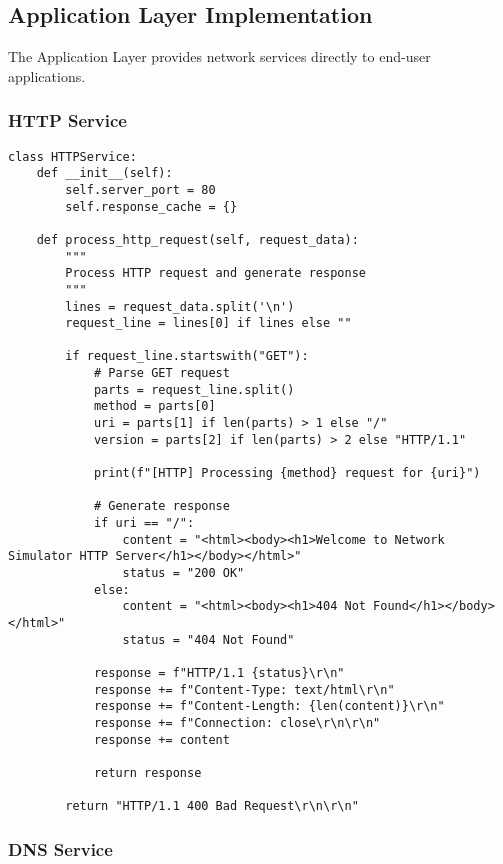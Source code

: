 \documentclass[12pt,a4paper]{article}
\begin{document}
\subsection{Application Layer Implementation}

The Application Layer provides network services directly to end-user applications.

\subsubsection{HTTP Service}

\begin{lstlisting}[caption=HTTP Protocol Implementation]
class HTTPService:
    def __init__(self):
        self.server_port = 80
        self.response_cache = {}
    
    def process_http_request(self, request_data):
        """
        Process HTTP request and generate response
        """
        lines = request_data.split('\n')
        request_line = lines[0] if lines else ""
        
        if request_line.startswith("GET"):
            # Parse GET request
            parts = request_line.split()
            method = parts[0]
            uri = parts[1] if len(parts) > 1 else "/"
            version = parts[2] if len(parts) > 2 else "HTTP/1.1"
            
            print(f"[HTTP] Processing {method} request for {uri}")
            
            # Generate response
            if uri == "/":
                content = "<html><body><h1>Welcome to Network Simulator HTTP Server</h1></body></html>"
                status = "200 OK"
            else:
                content = "<html><body><h1>404 Not Found</h1></body></html>"
                status = "404 Not Found"
            
            response = f"HTTP/1.1 {status}\r\n"
            response += f"Content-Type: text/html\r\n"
            response += f"Content-Length: {len(content)}\r\n"
            response += f"Connection: close\r\n\r\n"
            response += content
            
            return response
        
        return "HTTP/1.1 400 Bad Request\r\n\r\n"
\end{lstlisting}

\subsubsection{DNS Service}
\end{document}
